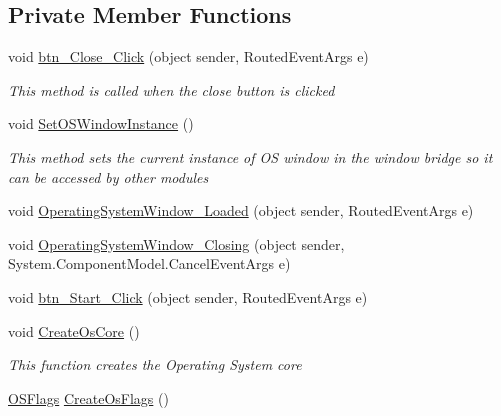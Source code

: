 \subsection*{Private Member Functions}
\begin{DoxyCompactItemize}
\item 
void \hyperlink{class_c_p_u___o_s___simulator_1_1_operating_system_main_window_a92ce496d30585ff30ac840fbeb7b8a16}{btn\+\_\+\+Close\+\_\+\+Click} (object sender, Routed\+Event\+Args e)
\begin{DoxyCompactList}\small\item\em This method is called when the close button is clicked \end{DoxyCompactList}\item 
void \hyperlink{class_c_p_u___o_s___simulator_1_1_operating_system_main_window_a0f58f20c1fe9dbc972fdf41ae871dea7}{Set\+O\+S\+Window\+Instance} ()
\begin{DoxyCompactList}\small\item\em This method sets the current instance of O\+S window in the window bridge so it can be accessed by other modules \end{DoxyCompactList}\item 
void \hyperlink{class_c_p_u___o_s___simulator_1_1_operating_system_main_window_a05b54ac7242f582757f99f3e7a6c48cf}{Operating\+System\+Window\+\_\+\+Loaded} (object sender, Routed\+Event\+Args e)
\item 
void \hyperlink{class_c_p_u___o_s___simulator_1_1_operating_system_main_window_a5e823b50dfab668d8e61d9d3ecea300c}{Operating\+System\+Window\+\_\+\+Closing} (object sender, System.\+Component\+Model.\+Cancel\+Event\+Args e)
\item 
void \hyperlink{class_c_p_u___o_s___simulator_1_1_operating_system_main_window_a49ee2facd64a57c8a3450ccd5582dfff}{btn\+\_\+\+Start\+\_\+\+Click} (object sender, Routed\+Event\+Args e)
\item 
void \hyperlink{class_c_p_u___o_s___simulator_1_1_operating_system_main_window_a61584b7f34a107e1c8c6cbbaff17641d}{Create\+Os\+Core} ()
\begin{DoxyCompactList}\small\item\em This function creates the Operating System core \end{DoxyCompactList}\item 
\hyperlink{struct_c_p_u___o_s___simulator_1_1_operating___system_1_1_o_s_flags}{O\+S\+Flags} \hyperlink{class_c_p_u___o_s___simulator_1_1_operating_system_main_window_aedcaa8273429f3867b3a2419981e4ca1}{Create\+Os\+Flags} ()

\end{DoxyCompactItemize}
